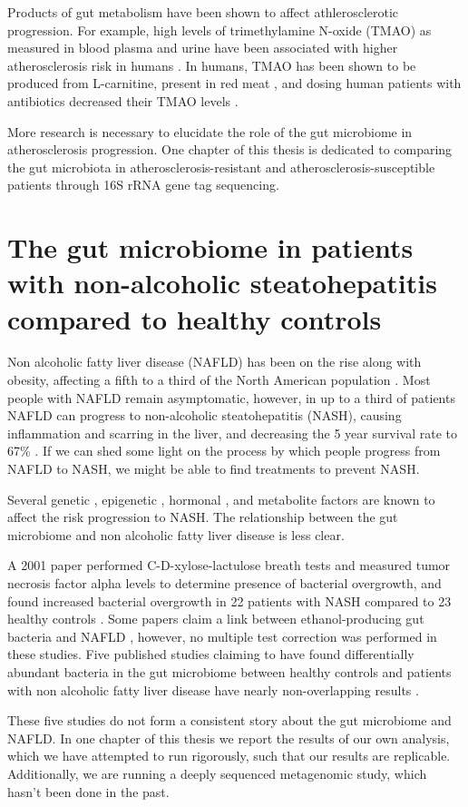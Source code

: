 Products of gut metabolism have been shown to affect athlerosclerotic progression. For example, high levels of trimethylamine N-oxide (TMAO) as measured in blood plasma and urine have been associated with higher atherosclerosis risk in humans \cite{tang2013intestinal}. In humans, TMAO has been shown to be produced from L-carnitine, present in red meat \cite{koeth2013intestinal}, and dosing human patients with antibiotics decreased their TMAO levels \cite{tang2013intestinal}.

More research is necessary to elucidate the role of the gut microbiome in atherosclerosis progression. One chapter of this thesis is dedicated to comparing the gut microbiota in atherosclerosis-resistant and atherosclerosis-susceptible patients through 16S rRNA gene tag sequencing.

\section{The gut microbiome in patients with non-alcoholic steatohepatitis compared to healthy controls}

Non alcoholic fatty liver disease (NAFLD) has been on the rise along with obesity, affecting a fifth to a third of the North American population \cite{preiss2008non}. Most people with NAFLD remain asymptomatic, however, in up to a third of patients NAFLD can progress to non-alcoholic steatohepatitis (NASH), causing inflammation and scarring in the liver, and decreasing the 5 year survival rate to 67\% \cite{propst1995prognosis}. If we can shed some light on the process by which people progress from NAFLD to NASH, we might be able to find treatments to prevent NASH.

Several genetic \cite{sookoian2011meta} \cite{rivera2007toll}, epigenetic \cite{murphy2013relationship}, hormonal \cite{yasuda1999suppressive}, and metabolite \cite{raman2013fecal} factors are known to affect the risk progression to NASH. The relationship between the gut microbiome and non alcoholic fatty liver disease is less clear.

A 2001 paper performed C-D-xylose-lactulose breath tests and measured tumor necrosis factor alpha levels to determine presence of bacterial overgrowth, and found increased bacterial overgrowth in 22 patients with NASH compared to 23 healthy controls \cite{wigg2001role}. Some papers claim a link between ethanol-producing gut bacteria and NAFLD \cite{zhu2013characterization} \cite{jiang2015dysbiosis}, however, no multiple test correction was performed in these studies. Five published studies claiming to have found differentially abundant bacteria in the gut microbiome between healthy controls and patients with non alcoholic fatty liver disease have nearly non-overlapping results \cite{zhu2013characterization} \cite{wong2013molecular} \cite{raman2013fecal} \cite{jiang2015dysbiosis} \cite{boursier2016severity}.

These five studies do not form a consistent story about the gut microbiome and NAFLD. In one chapter of this thesis we report the results of our own analysis, which we have attempted to run rigorously, such that our results are replicable. Additionally, we are running a deeply sequenced metagenomic study, which hasn’t been done in the past.
